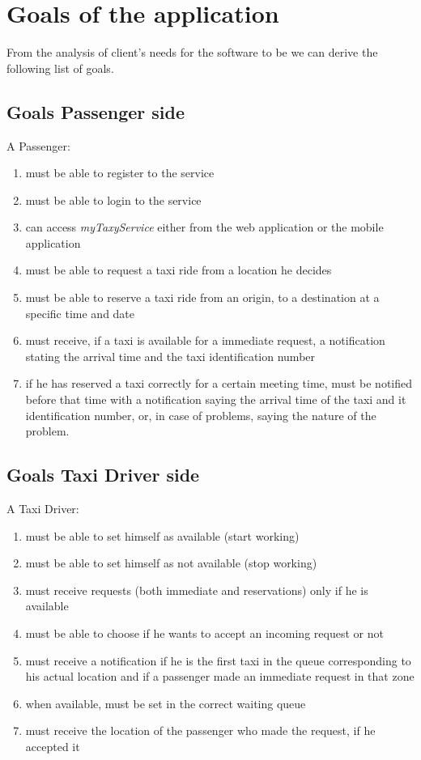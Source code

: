 \section{Goals of the application}
From the analysis of client's needs for the software to be we can derive the following list of goals.
\subsection{Goals Passenger side}
A Passenger:
\begin{enumerate}
\item must be able to register to the service
\item must be able to login to the service
\item can access \textit{myTaxyService} either from the web application or the mobile application
\item must be able to request a taxi ride from a location he decides
\item must be able to reserve a taxi ride from an origin, to a destination at a specific time and date
\item must receive, if a taxi is available for a immediate request, a notification stating the arrival time and the taxi identification number
\item if he has reserved a taxi correctly for a certain meeting time, must be notified before that time with a notification saying the arrival time of the taxi and it identification number, or, in case of problems, saying the nature of the problem.
\end{enumerate}
\subsection{Goals Taxi Driver side}
A Taxi Driver:
\begin{enumerate}
\item must be able to set himself as available (start working) 
\item must be able to set himself as not available (stop working)
\item must receive requests (both immediate and reservations) only if he is available 
\item must be able to choose if he wants to accept an incoming request or not
\item must receive a notification if he is the first taxi in the queue corresponding to his actual location and if a passenger made an immediate request in that zone
\item when available, must be set in the correct waiting queue
\item must receive the location of the passenger who made the request, if he accepted it
\end{enumerate}

